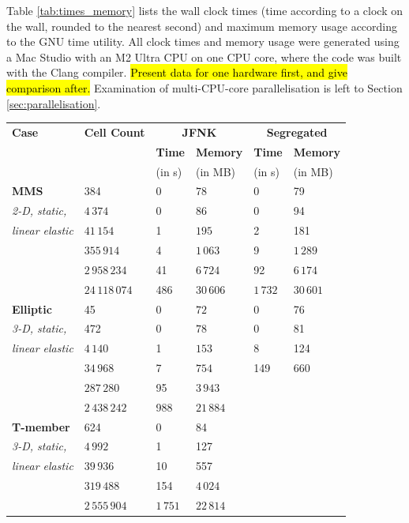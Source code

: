 \documentclass[sn-mathphys,Numbered]{sn-jnl}%
\begin{document}
Table \ref{tab:times_memory} lists the wall clock times (time according to a clock on the wall, rounded to the nearest second) and maximum memory usage according to the GNU time utility.
All clock times and memory usage were generated using a Mac Studio with an M2 Ultra CPU on one CPU core, where the code was built with the Clang compiler.
\hl{Present data for one hardware first, and give comparison after.}
Examination of multi-CPU-core parallelisation is left to Section \ref{sec:parallelisation}.
\begin{table}[!htb]
	\centering
		\begin{tabular}{ll|ll|ll}
			\hline
			\textbf{Case} & \textbf{Cell Count} & \multicolumn{2}{c|}{\textbf{JFNK}} & \multicolumn{2}{c}{\textbf{Segregated}} \\
			     &            & \textbf{Time} & \textbf{Memory} & \textbf{Time} & \textbf{Memory} \\
			     &            & (in s) & (in MB) & (in s) & (in MB) \\
			\hline 
			\textbf{MMS} & 384 & 0 & $78$ 				& 0 & 79 \\
			\emph{2-D, static,}	& $4\,374$ & 0 & $86$ 			& 0 & 94 \\
			\emph{linear elastic} & $41\,154$ & 1 & $195$  		& 2 & 181 \\
				&  $355\,914$ & 4 & $1\,063$ 		& 9 & $1\,289$ \\
				& $2\,958\,234$ & 41 & $6\,724$ 	& 92 & $6\,174$ \\
				& $24\,118\,074$ & 486 & $30\,606$ & $1\,732$ & $30\,601$ \\
			\hline
			\textbf{Elliptic} & 45 & 0 & $72$ & 0 & 76 \\
			\emph{3-D, static,} & 472 & 0 & $78$ & 0 & 81 \\
			\emph{linear elastic} & $4\,140$ & 1 & $153$ & 8 & 124 \\
				& $34\,968$ & 7 & $754$ & 149 & 660 \\
				& $287\,280$ & 95 & $3\,943$ &  &  \\
				& $2\,438\,242$ & 988 & $21\,884$ &  &  \\
			\hline
			\textbf{T-member} & 624& 0 & 84 					&  &  \\
			\emph{3-D, static,} & $4\,992$ & 1 & 127 				&  &  \\
			\emph{linear elastic} & $39\,936$ & 10 & 557				&  &  \\
				& $319\,488$ & 154 & $4\,024$ 		&  &  \\
				& $2\,555\,904$ & $1\,751$ & $22\,814$ 	&  &  \\

\end{tabular}
\end{table}
\end{document}
